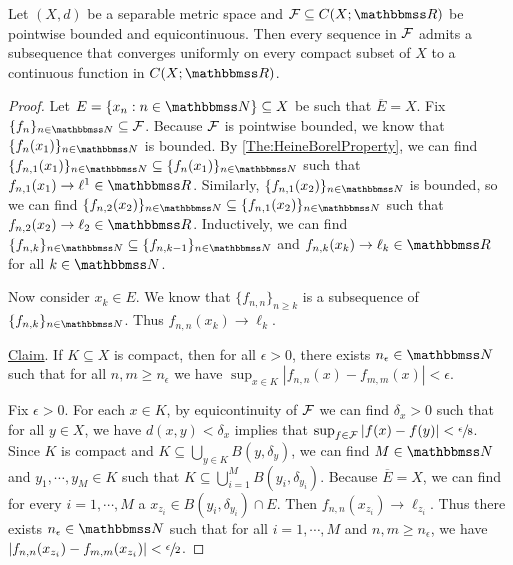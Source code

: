 \documentclass[screen,single]{techreport}
\numberwithin{equation}{section}
\begin{document}
\begin{theorem}\label{The:AscoliArzela}
  Let $(X,d)$ be a separable metric space and $\calF \subseteq C(X;\bbR)$ be pointwise bounded and equicontinuous.
  Then every sequence in $\mathcal{F}$ admits a subsequence that converges uniformly on every compact subset of $X$ to a continuous function in $C(X;\bbR)$.
\end{theorem}
\begin{proof}
  Let $E = \{x_n : n \in \bbN\} \subseteq X$ be such that $\overline{E} = X$.
  Fix $\{f_n\}_{n \in \bbN} \subseteq \calF$.
  Because $\mathcal{F}$ is pointwise bounded, we know that $\{f_n(x_1)\}_{n \in \bbN}$ is bounded.
  By \cref{The:HeineBorelProperty}, we can find $\{f_{n,1}(x_1)\}_{n \in \bbN} \subseteq \{ f_n(x_1) \}_{n \in \bbN}$ such that $f_{n,1}(x_1) \rightarrow \ell^1 \in \bbR$.
  Similarly, $\{f_{n,1}(x_2)\}_{n \in \bbN}$ is bounded, so we can find $\{f_{n,2}(x_2)\}_{n\in \bbN} \subseteq \{ f_{n,1}(x_2) \}_{n \in \bbN}$ such that $f_{n,2}(x_2) \rightarrow \ell_2 \in \bbR$.
  Inductively, we can find $\{f_{n,k}\}_{n \in \bbN} \subseteq \{f_{n,k-1}\}_{n \in \bbN}$ and $f_{n,k}(x_k) \rightarrow \ell_k \in \bbR$ for all $k \in \bbN$.
  
  Now consider $x_k \in E$.
  We know that $\{f_{n,n}\}_{n \ge k}$ is a subsequence of $\{f_{n,k}\}_{n \in \bbN}$.
  Thus $f_{n,n}(x_k) \rightarrow \ell_k$.
  
  \underline{Claim}. If $K \subseteq X$ is compact, then for all $\epsilon > 0$, there exists $n_\epsilon \in \bbN$ such that for all $n,m \ge n_\epsilon$ we have $\sup_{x \in K} |f_{n,n}(x) - f_{m,m}(x)| < \epsilon$.
  
  Fix $\epsilon > 0$. For each $x \in K$, by equicontinuity of $\mathcal{F}$ we can find $\delta_x > 0$ such that for all $y \in X$, we have $d(x,y) < \delta_x$ implies that $\sup_{f \in \mathcal{F}} |f(x) - f(y)| < \sfrac{\epsilon}{8}$.
  Since $K$ is compact and $K \subseteq \bigcup_{y \in K} B(y,\delta_y)$, we can find $M \in \bbN$ and $y_1,\cdots,y_M \in K$ such that $K \subseteq \bigcup_{i=1}^M B(y_i,\delta_{y_i})$.
  Because $\overline{E} = X$, we can find for every $i=1,\cdots,M$ a $x_{z_i} \in B(y_i,\delta_{y_i}) \cap E$.
  Then $f_{n,n}(x_{z_i}) \rightarrow \ell_{z_i}$.
  Thus there exists $n_\epsilon \in \bbN$ such that for all $i=1,\cdots,M$ and $n,m \ge n_\epsilon$, we have $|f_{n,n}(x_{z_i}) - f_{m,m}(x_{z_i})| < \sfrac{\epsilon}{2}$.
  

\end{proof}
\end{document}

